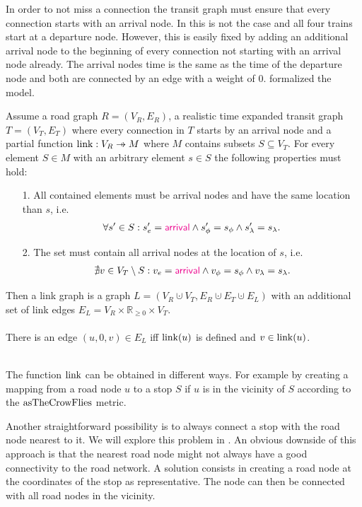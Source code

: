 	In order to not miss a connection the transit graph must ensure that every connection starts with an arrival node.
	In  this is not the case and all four trains start at a departure node. However,
	this is easily fixed by adding an additional arrival node to the beginning of every connection not starting with an arrival node already.
	The arrival nodes time is the same as the time of the departure node and both are connected by an edge with a weight of $0$.
	 formalized the model.
	\begin{mydef}\label{linkGraph}
		Assume a road graph $R = (V_R, E_R)$, a realistic time expanded transit graph $T = (V_T, E_T)$ where
		every connection in $T$ starts by an arrival node and a partial function $\link: V_R \pto M$ where $M$
		contains subsets $S \subseteq V_T$. For every element $S \in M$ with an arbitrary element $s \in S$ the following
		properties must hold:
		\begin{itemize}
			\item[1.]
				All contained elements must be arrival nodes and have the same location than $s$, i.e.
				\begin{align*}
					\forall s' \in S: s'_e = \textcolor{magenta}{\textsf{arrival}} \land s'_\phi = s_\phi \land s'_\lambda = s_\lambda.
				\end{align*}
			\item[2.]
				The set must contain all arrival nodes at the location of $s$, i.e.
				\begin{align*}
					\nexists v \in V_T \setminus S: v_e = \textcolor{magenta}{\textsf{arrival}} \land v_\phi = s_\phi \land v_\lambda = s_\lambda.
				\end{align*}
		\end{itemize}
		Then a \textnormal{link graph} is a graph $L = (V_R \cupdot V_T, E_R \cupdot E_T \cupdot E_L)$ with
		an additional set of link edges $E_L = V_R \times \mathbb{R}_{\ge 0} \times V_T$.\\\\
		There is an edge $(u, 0, v) \in E_L$ iff $\operatorname{link}(u)$ is defined and $v \in \operatorname{link}(u)$.
	\end{mydef}\quad\\
	The function $\operatorname{link}$ can be obtained in different ways. For example by creating a mapping from a road node $u$ to
	a stop $S$ if $u$ is in the vicinity of $S$ according to the $\operatorname{asTheCrowFlies}$ metric.
	
	Another straightforward possibility is to always connect a stop with the road node nearest to it. We will explore
	this problem in . An obvious downside of this approach is that the nearest road node
	might not always have a good connectivity to the road network. A solution consists in creating a road node at the coordinates
	of the stop as representative. The node can then be connected with all road nodes in the vicinity.

